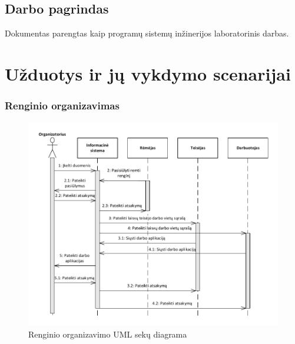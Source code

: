 \documentclass{VUMIFPSkursinis}
\begin{document}
		\subsection*{Darbo pagrindas}  \label{ivadas_darboPagrindas}
			Dokumentas parengtas kaip programų sistemų inžinerijos laboratorinis darbas.
			
    \section{Užduotys ir jų vykdymo scenarijai} \label{uzduotysIrJuVykdymoScenarijai}
	
        \subsubsection*{Renginio organizavimas}
		
			\begin{figure}[H]
				\centering
				\includegraphics[width=\textwidth]{img/IsPSI1ScenarijausSekuDiagrama1}
				\caption{Renginio organizavimo UML sekų diagrama}
				\label{fig:scenarijusOrganizavimoSekuDiagrama}
			\end{figure}
\end{document}
